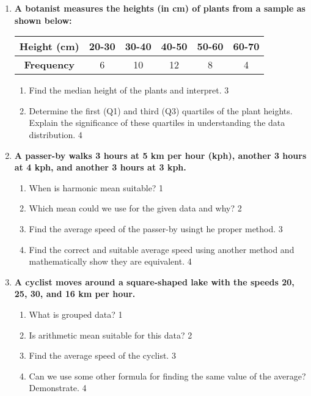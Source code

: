 \documentclass[a4paper,oneside]{book}
\begin{document}
\begin{enumerate}
\item
\textbf{A botanist measures the heights (in cm) of plants from a sample as shown below:}

\begin{table}[h]
\centering
\begin{tabular}{c|c|c|c|c|c}
\textbf{Height (cm)} & 20-30 & 30-40 & 40-50 & 50-60 & 60-70 \\ \hline
\textbf{Frequency} & 6 & 10 & 12 & 8 & 4
\end{tabular}
\end{table}

\begin{enumerate}
    \item  
    Find the median height of the plants and interpret. \hfill 3
    \item
    Determine the first (Q1) and third (Q3) quartiles of the plant heights. Explain the significance of these quartiles in understanding the data distribution. \hfill 4
\end{enumerate}

  
   \item
	  \textbf{A passer-by walks 3 hours at 5 km per hour (kph), another 3 hours 
	  at 4 kph, and another 3 hours at 3 kph.} 
  
  \begin{enumerate}
    \item
	When is harmonic mean suitable? \hfill 1
    \item
	Which mean could we use for the given data and why? \hfill 2
    \item  
	Find the average speed of the passer-by usingt he proper method. \hfill 3
    \item
	Find the correct and suitable average speed using another method and mathematically show they are equivalent. \hfill 4
  \end{enumerate}

 \item
	  \textbf{A cyclist moves around a square-shaped lake with the speeds 20, 25, 30, and 16 km per hour.} 
  
  \begin{enumerate}
    \item
	What is grouped data? \hfill 1
    \item
	Is arithmetic mean suitable for this data? \hfill 2
    \item  
	Find the average speed of the cyclist. \hfill 3
    \item
	Can we use some other formula for finding the same value of the average? Demonstrate. \hfill 4
  \end{enumerate}
  

\end{enumerate}
\end{document}
